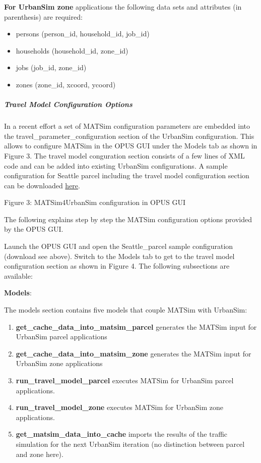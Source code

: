 \documentclass[a4paper,11pt]{report}
\begin{document}
\textbf{For UrbanSim zone} applications the following data sets and attributes (in parenthesis) are required:
\begin{itemize}
	\item persons (person\_id, household\_id, job\_id)
	\item households (household\_id, zone\_id)
	\item jobs (job\_id, zone\_id)
	\item zones (zone\_id, xcoord, ycoord)
\end{itemize}

\subparagraph{Travel Model Configuration Options}

In a recent effort a set of MATSim configuration parameters are  embedded into the travel\_parameter\_configuration section of the UrbanSim  configuration. This allows to configure MATSim in the OPUS GUI under  the Models tab as shown in Figure 3. The travel model conguration  section consists of a few lines of XML code and can be added into  existing UrbanSim configurations. A sample configuration for Seattle  parcel including the travel model configuration section can be  downloaded \href{https://svn.vsp.tu-berlin.de/repos/public-svn/matsim/examples/countries/us/seattle/seattle_parcel.xml}{here}.



Figure 3: MATSim4UrbanSim configuration in OPUS GUI

The following explains step by step the MATSim configuration options provided by the OPUS GUI.

Launch the OPUS GUI and open the Seattle\_parcel sample configuration  (download see above). Switch to the Models tab to get to the travel  model configuration section as shown in Figure 4. The following  subsections are available:

\textbf{Models}:

The models section contains five models that couple MATSim with UrbanSim:
\begin{enumerate}
	\item \textbf{get\_cache\_data\_into\_matsim\_parcel} generates the MATSim input for UrbanSim parcel applications
	\item \textbf{get\_cache\_data\_into\_matsim\_zone} generates the MATSim input for UrbanSim zone applications
	\item \textbf{run\_travel\_model\_parcel }executes MATSim for UrbanSim parcel applications.
	\item \textbf{run\_travel\_model\_zone} executes MATSim for UrbanSim zone applications.
	\item \textbf{get\_matsim\_data\_into\_cache} imports the results of the traffic simulation for the next UrbanSim iteration (no distinction between parcel and zone here).
\end{enumerate}
\end{document}

